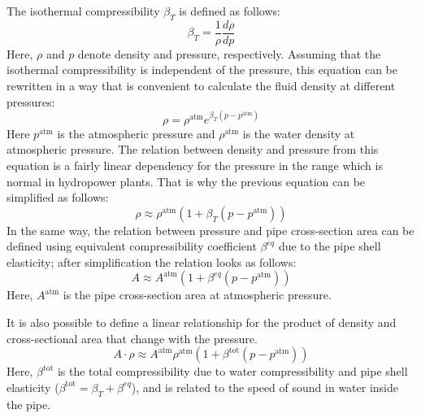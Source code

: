 \documentclass[%
]{USN-PhD}
\begin{document}
The isothermal compressibility $\beta_T$ is defined as follows:
\begin{equation}
\beta_T = \frac{1}{\rho}\frac{d\rho}{dp}
\end{equation}
Here, $\rho$ and $p$ denote density and pressure, respectively. Assuming that the isothermal compressibility is independent of the pressure, this equation can be rewritten in a way that is convenient to calculate the fluid density at different pressures:
\begin{equation}
\rho = \rho^{\text{atm}}e^{\beta_T(p-p^{\text{atm}})}
\end{equation}
Here $p^{\text{atm}}$ is the atmospheric pressure and $\rho^{\text{atm}}$ is the water density at atmospheric pressure. The relation between density and pressure from this equation is a fairly linear dependency for the pressure in the range which is normal in hydropower plants. That is why the previous equation can be simplified as follows:
\begin{equation}
\rho \approx \rho^{\text{atm}}(1+{\beta_T(p-p^{\text{atm}})})
\end{equation}
In the same way, the relation between pressure and pipe cross-section area can be defined using equivalent compressibility coefficient $\beta^{eq}$ due to the pipe shell elasticity; after simplification the relation looks as follows:
\begin{equation}
A \approx A^{\text{atm}}(1+{\beta^{eq}(p-p^{\text{atm}})})
\end{equation}
Here, $A^{\text{atm}}$ is the pipe cross-section area at atmospheric pressure.

It is also possible to define a linear relationship for the product of density and cross-sectional area that change with the pressure.
\begin{equation}
A\cdot\rho \approx A^{\text{atm}}\rho^{\text{atm}}(1+{\beta^\mathrm{tot}(p-p^{\text{atm}})})
\end{equation}
Here, $\beta^\mathrm{tot}$ is the total compressibility due to water compressibility and pipe shell elasticity ($\beta^\mathrm{tot}=\beta_T+\beta^{eq}$), and is related to the speed of sound in water inside the pipe.
\end{document}
